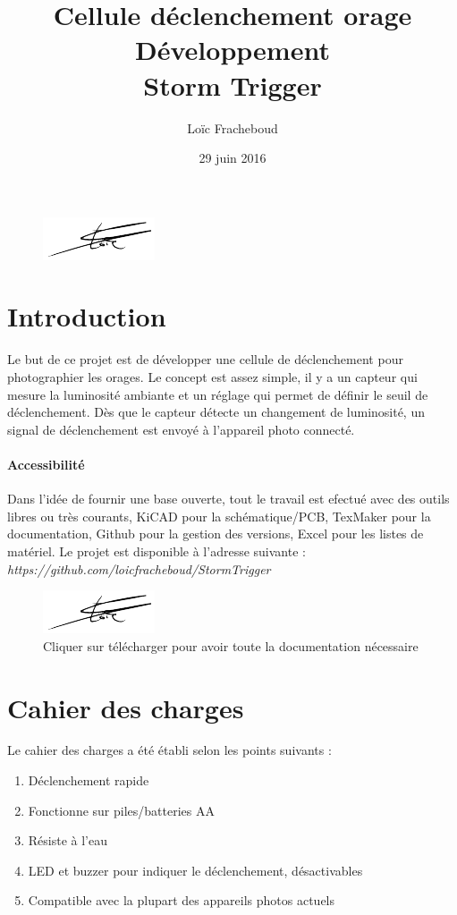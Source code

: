 \documentclass[a4paper,10pt]{article}
\author{Loïc Fracheboud}
\title{Cellule déclenchement orage \\ Développement \\ \Huge Storm Trigger}
\date{29 juin 2016}
\begin{document}
 \maketitle

 \begin{figure}[!h]
 \centering
 \vspace{80pt}
 \includegraphics[scale=0.2]{images/signfracheboud}
 \end{figure}
 \pagebreak
 
 \section{Introduction}
  Le but de ce projet est de développer une cellule de déclenchement pour photographier les orages. Le concept est assez simple, il y a un capteur qui mesure la luminosité ambiante et un réglage qui permet de définir le seuil de déclenchement. Dès que le capteur détecte un changement de luminosité, un signal de déclenchement est envoyé à l'appareil photo connecté. \\

 \paragraph{Accessibilité}
 Dans l'idée de fournir une base ouverte, tout le travail est efectué avec des outils libres ou très courants, KiCAD pour la schématique/PCB, TexMaker pour la documentation, Github pour la gestion des versions, Excel pour les listes de matériel.
Le projet est disponible à l'adresse suivante : {\itshape https://github.com/loicfracheboud/StormTrigger}
  \begin{figure}[!h]
 \centering
 \vspace{5pt}
 \includegraphics[scale=0.25]{images/signfracheboud}
 \caption{Cliquer sur télécharger pour avoir toute la documentation nécessaire}
 \end{figure}
  \pagebreak

  \section{Cahier des charges}
  Le cahier des charges a été établi selon les points suivants :
  \begin{enumerate}
    \item Déclenchement rapide
    \item Fonctionne sur piles/batteries AA
    \item Résiste à l'eau
    \item LED et buzzer pour indiquer le déclenchement, désactivables
    \item Compatible avec la plupart des appareils photos actuels
    \end{enumerate}  
  
\end{document}
